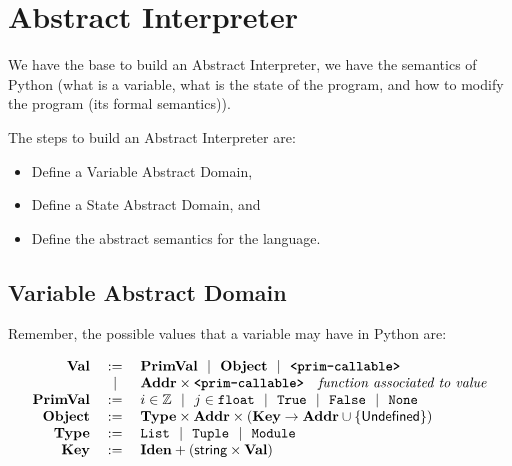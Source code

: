\begin{enumerate}
%

\end{enumerate}

\section{Abstract Interpreter}\label{abstract-interpreter}

We have the base to build an Abstract Interpreter, we have the semantics
of Python (what is a variable, what is the state of the program, and how
to modify the program (its formal semantics)).

The steps to build an Abstract Interpreter are:

\begin{itemize}
\tightlist
\item
  Define a Variable Abstract Domain,
\item
  Define a State Abstract Domain, and
\item
  Define the abstract semantics for the language.
\end{itemize}

\subsection{Variable Abstract Domain}\label{variable-abstract-domain}

Remember, the possible values that a variable may have in Python are:

\vspace*{-1em}
\[\begin{array}{rcl}
  \mathbf{Val} &:=& \mathbf{PrimVal} ~~|~~ \mathbf{Object} ~~|~~ \textbf{\texttt{<prim-callable>}} \\
         &~~|~~& \mathbf{Addr} \times \textbf{\texttt{<prim-callable>}} \quad \textit{function associated to value} \\
  \mathbf{PrimVal} &:=& i \in \mathbb{Z} ~~|~~ j \in \texttt{float} ~~|~~ \texttt{True} ~~|~~ \texttt{False} ~~|~~ \texttt{None} \\
  \mathbf{Object} &:=& \mathbf{Type} \times \mathbf{Addr} \times \left(\mathbf{Key} \to \mathbf{Addr} \cup \{\mathsf{Undefined}\}\right) \\
  \mathbf{Type} &:=& \texttt{List} ~~|~~ \texttt{Tuple} ~~|~~ \texttt{Module} \\
  \mathbf{Key} &:=& \mathbf{Iden} + \left(\textsf{string} \times \mathbf{Val}\right) \\
\end{array}\]


